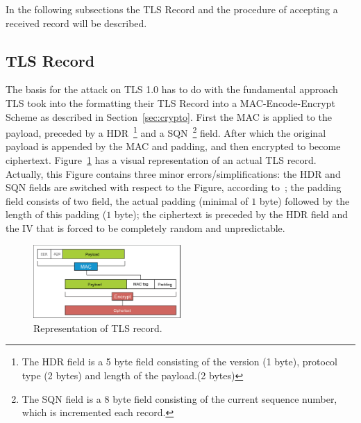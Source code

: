 \documentclass[10pt,conference,a4paper]{IEEEtran}
\begin{document}
In the following subsections the TLS Record and the procedure of accepting a received record will be described.

\subsection{TLS Record}
\label{sec:tls:record}
The basis for the attack on TLS 1.0 has to do with the fundamental approach TLS took into the formatting their TLS Record into a MAC-Encode-Encrypt Scheme as described in Section~\ref{sec:crypto}. First the MAC is applied to the payload, preceded by a HDR~\footnote{The HDR field is a 5 byte field consisting of the version (1 byte), protocol type (2 bytes) and length of the payload.(2 bytes)} and a SQN~\footnote{The SQN field is a 8 byte field consisting of the current sequence number, which is incremented each record.} field. After which the original payload is appended by the MAC and padding, and then encrypted to become ciphertext. Figure~\ref{fig:tls} has a visual representation of an actual TLS record. Actually, this Figure contains three minor errors/simplifications: the HDR and SQN fields are switched with respect to the Figure, according to~\cite{ietf2008transport}; the padding field consists of two field, the actual padding (minimal of $1$ byte) followed by the length of this padding ($1$ byte); the ciphertext is preceded by the HDR field and the IV that is forced to be completely random and unpredictable.

\begin{figure}[h]
	\centering
	\includegraphics[width=0.5\textwidth]{tls-representation.jpg}
	\caption{Representation of TLS record.~\cite{alfardan2013lucky}}
	\label{fig:tls}
\end{figure}
\end{document}
